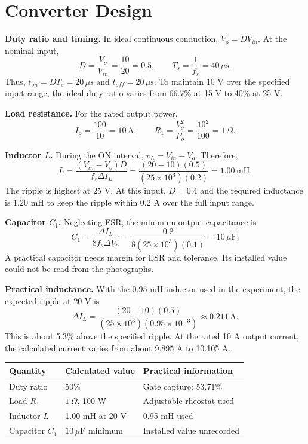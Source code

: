 \documentclass[11pt,a4paper]{article}
\begin{document}
\section{Converter Design}
\textbf{Duty ratio and timing.} In ideal continuous conduction, $V_o=DV_{in}$. At the nominal input,
\begin{equation}
D=\frac{V_o}{V_{in}}=\frac{10}{20}=0.5,\qquad T_s=\frac{1}{f_s}=40\,\mu\mathrm{s}.
\end{equation}
Thus, $t_{on}=DT_s=20\,\mu\mathrm{s}$ and $t_{off}=20\,\mu\mathrm{s}$. To maintain 10 V over the specified input range, the ideal duty ratio varies from 66.7\% at 15 V to 40\% at 25 V.

\textbf{Load resistance.} For the rated output power,
\begin{equation}
I_o=\frac{100}{10}=10\,\mathrm{A},\qquad R_1=\frac{V_o^2}{P_o}=\frac{10^2}{100}=1\,\Omega.
\end{equation}


\newpage
\textbf{Inductor $L$.} During the ON interval, $v_L=V_{in}-V_o$. Therefore,
\begin{equation}
L=\frac{(V_{in}-V_o)D}{f_s\Delta I_L}
=\frac{(20-10)(0.5)}{(25\times10^3)(0.2)}=1.00\,\mathrm{mH}.
\end{equation}
The ripple is highest at 25 V. At this input, $D=0.4$ and the required inductance is $1.20$ mH to keep the ripple within 0.2 A over the full input range.

\textbf{Capacitor $C_1$.} Neglecting ESR, the minimum output capacitance is
\begin{equation}
C_1=\frac{\Delta I_L}{8f_s\Delta V_o}
=\frac{0.2}{8(25\times10^3)(0.1)}=10\,\mu\mathrm{F}.
\end{equation}
A practical capacitor needs margin for ESR and tolerance. Its installed value could not be read from the photographs.

\textbf{Practical inductance.} With the $0.95$ mH inductor used in the experiment, the expected ripple at 20 V is
\begin{equation}
\Delta I_L=\frac{(20-10)(0.5)}{(25\times10^3)(0.95\times10^{-3})}
\approx0.211\,\mathrm{A}.
\end{equation}
This is about 5.3\% above the specified ripple. At the rated 10 A output current, the calculated current varies from about 9.895 A to 10.105 A.

\begin{center}
\begin{tabular}{lll}\toprule
Quantity & Calculated value & Practical information\\\midrule
Duty ratio & 50\% & Gate capture: 53.71\%\\
Load $R_1$ & $1\,\Omega$, 100 W & Adjustable rheostat used\\
Inductor $L$ & 1.00 mH at 20 V & 0.95 mH used\\
Capacitor $C_1$ & $10\,\mu$F minimum & Installed value unrecorded\\\bottomrule
\end{tabular}
\end{center}
\end{document}
